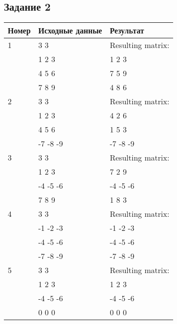 \subsection*{\centering Задание 2}
\begin{table}[H]
    \centering
    \begin{tabular}{|l|l|l|}
        \hline
        Номер & Исходные данные & Результат\\[2ex] \hline
        1     & 3 3             & Resulting matrix:\\
              & 1 2 3           & 1 2 3\\ 
              & 4 5 6           & 7 5 9\\ 
              & 7 8 9           & 4 8 6\\[2ex]\hline
        2     & 3 3             & Resulting matrix:\\
              & 1 2 3           & 4 2 6\\ 
              & 4 5 6           & 1 5 3\\ 
              & -7 -8 -9        & -7 -8 -9\\[2ex]\hline
        3     & 3 3             & Resulting matrix:\\
              & 1 2 3           & 7 2 9\\ 
              & -4 -5 -6        & -4 -5 -6\\ 
              & 7 8 9           & 1 8 3\\[2ex]\hline
        4     & 3 3             & Resulting matrix:\\
              & -1 -2 -3        & -1 -2 -3\\ 
              & -4 -5 -6        & -4 -5 -6\\ 
              & -7 -8 -9        & -7 -8 -9\\[2ex]\hline
        5     & 3 3             & Resulting matrix:\\
              & 1 2 3           & 1 2 3\\ 
              & -4 -5 -6        & -4 -5 -6\\ 
              & 0 0 0           & 0 0 0\\[2ex]\hline
    \end{tabular}
\end{table}
